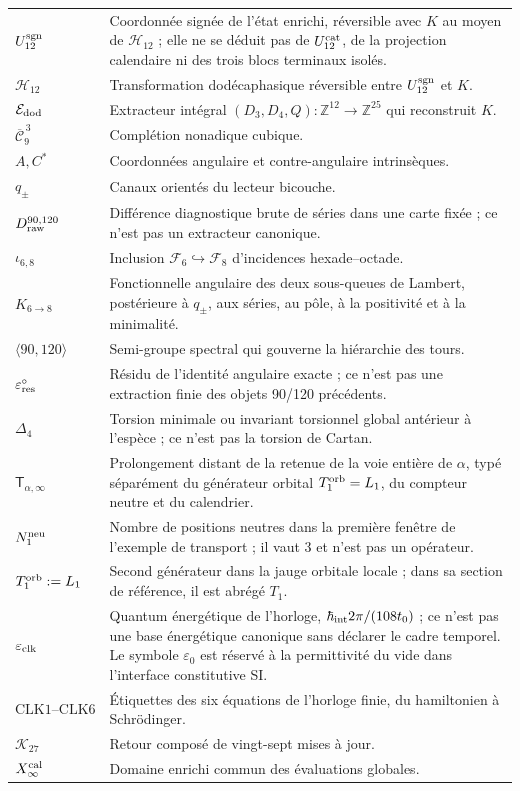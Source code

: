 \begin{longtable}{@{}p{}p{}@{}}
\(U_{12}^{\rm sgn}\)&Coordonnée signée de l'état enrichi, réversible
avec \(K\) au moyen de \(\mathcal H_{12}\) ; elle ne se déduit pas de
\(U_{12}^{\rm cat}\), de la projection calendaire ni des trois blocs terminaux
isolés.\\
\(\mathcal H_{12}\)&Transformation dodécaphasique réversible entre
\(U_{12}^{\rm sgn}\) et \(K\).\\
\(\mathcal E_{\rm dod}\)&Extracteur intégral
\((D_3,D_4,Q):\mathbb Z^{12}\to\mathbb Z^{25}\) qui reconstruit \(K\).\\
\(\overline{\mathcal C}_9^{\,3}\)&Complétion nonadique cubique.\\
\(A,C^*\)&Coordonnées angulaire et contre-angulaire intrinsèques.\\
\(q_\pm\)&Canaux orientés du lecteur bicouche.\\
\(D_{\rm raw}^{90,120}\)&Différence diagnostique brute de séries dans une
carte fixée ; ce n'est pas un extracteur canonique.\\
\(\iota_{6,8}\)&Inclusion
\(\mathcal F_6\hookrightarrow\mathcal F_8\) d'incidences hexade--octade.\\
\(K_{6\to8}\)&Fonctionnelle angulaire des deux sous-queues de Lambert, postérieure à
\(q_\pm\), aux séries, au pôle, à la positivité et à la minimalité.\\
\(\langle90,120\rangle\)&Semi-groupe spectral qui gouverne la hiérarchie des
tours.\\
\(\varepsilon_{\rm res}^{\circ}\)&Résidu de l'identité angulaire exacte ;
ce n'est pas une extraction finie des objets 90/120 précédents.\\
\(\Delta_4\)&Torsion minimale ou invariant torsionnel global antérieur à
l'espèce ; ce n'est pas la torsion de Cartan.\\
\(\mathsf T_{\alpha,\infty}\)&Prolongement distant de la retenue de la voie
entière de \(\alpha\), typé séparément du générateur orbital
\(T_1^{\rm orb}=L_1\), du compteur neutre et du calendrier.\\
\(N_1^{\rm neu}\)&Nombre de positions neutres dans la première fenêtre de
l'exemple de transport ; il vaut $3$ et n'est pas un opérateur.\\
\(T_1^{\rm orb}:=L_1\)&Second générateur dans la jauge orbitale locale ; dans sa
section de référence, il est abrégé \(T_1\).\\
\(\varepsilon_{\rm clk}\)&Quantum énergétique de l'horloge,
\(\hbar_{\rm int}2\pi/(108t_0)\) ; ce n'est pas une base énergétique canonique sans
déclarer le cadre temporel. Le symbole \(\varepsilon_0\) est réservé à
la permittivité du vide dans l'interface constitutive SI.\\
\(\mathrm{CLK}1\text{--}\mathrm{CLK}6\)&Étiquettes des six équations de
l'horloge finie, du hamiltonien à Schrödinger.\\
\(\mathcal K_{27}\)&Retour composé de vingt-sept mises à jour.\\
\(X_\infty^{\rm cal}\)&Domaine enrichi commun des évaluations
globales.\\
\bottomrule
\end{longtable}

